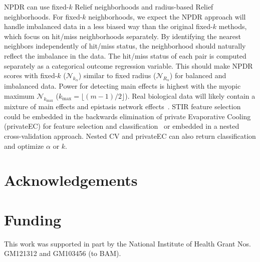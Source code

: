 \documentclass[10pt]{article}
\begin{document}
NPDR can use fixed-$k$ Relief neighborhoods and radius-based Relief neighborhoods.
For fixed-$k$ neighborhoods, we expect the NPDR approach will handle imbalanced data in a less biased way than the original fixed-$k$ methods, which focus on hit/miss neighborhoods separately.
By identifying the nearest neighbors independently of hit/miss status, the neighborhood should naturally reflect the imbalance in the data.
The hit/miss status of each pair is computed separately as a categorical outcome regression variable.
This should make NPDR scores with fixed-$k$ ($\mathcal{N}_{k_\alpha}$) similar to fixed radius ($\mathcal{N}_{R_\alpha}$) for balanced and imbalanced data.
Power for detecting main effects is highest with the myopic maximum $\mathcal{N}_{k_\text{max}}$ ($k_{\text{max}}=\lfloor (m-1)/2\rfloor$).
Real biological data will likely contain a mixture of main effects and epistasis network effects~\cite{mckinney_pajewski}.
STIR feature selection could be embedded in the backwards elimination of private Evaporative Cooling (privateEC) for feature selection and classification~\cite{le17} or embedded in a nested cross-validation approach.
Nested CV and privateEC can also return classification and optimize $\alpha$ or $k$.

\section*{Acknowledgements}

\section*{Funding}
This work was supported in part by the National Institute of Health Grant Nos. GM121312 and GM103456 (to BAM).


\end{document}
